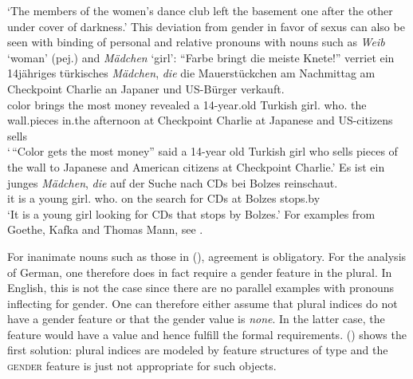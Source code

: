 \glt `The members of the women's dance club left the basement one after the other under cover of darkness.'
\zl
This deviation from gender in favor of sexus can also be seen with binding of personal and relative pronouns with nouns such as
\emph{Weib} `woman' (pej.) and \emph{Mädchen} `girl':
\eal
\ex 
\gll "`Farbe bringt die meiste Knete!"' verriet ein 14jähriges türkisches {\em Mädchen\/}, {\em die\/} die Mauerstückchen am
      Nachmittag am Checkpoint Charlie an Japaner und US-Bürger verkauft.\footnotemark\\
color brings the most money revealed a 14-year.old Turkish girl.\neu{} who.\fem{} the wall.pieces
in.the afternoon at Checkpoint Charlie at Japanese and US-citizens sells\\  
\glt `\,``Color gets the most money'' said a 14-year old Turkish girl who sells pieces of the wall to Japanese and American citizens
at Checkpoint Charlie.'
\ex 
\gll Es ist ein junges {\em Mädchen\/}, {\em die\/} auf der Suche nach CDs bei Bolzes reinschaut.\footnotemark\\
	 it is a young girl.\neu{} who.\fem{} on the search for CDs at Bolzes stops.by\\
\glt `It is a young girl looking for CDs that stops by Bolzes.' 
\zl
For examples from Goethe, Kafka and Thomas Mann, see . 

For inanimate nouns such as those in (), agreement is obligatory. For the analysis of
German, one therefore does in fact require a gender feature in the plural. In English, this is not
the case since there are no parallel examples with pronouns inflecting for gender. One can therefore
either assume that plural indices do not have a gender feature or that the gender value is
\emph{none}. In the latter case, the feature would have a value and hence fulfill the formal requirements.
() shows the first solution: plural indices are modeled by feature structures of
type  and the \textsc{gender} feature is just not appropriate for such objects.

